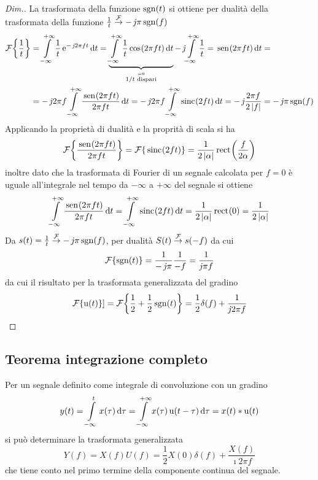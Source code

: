 \begin{proof}[Dim.]
La trasformata della funzione $\operatorname{sgn}(t)$ si ottiene per dualità della trasformata della funzione $\frac{1}{t}\overset{\operatorname{\mathcal{F}}}{\to}-\operatorname{\mathit{j}\!}\pi\operatorname{sgn}(f)$
\begin{align*}
	\fourier{\frac{1}{t}}&=\intinf{\frac{1}{t}\e{-\imath 2\pi f t}}{t}= \underbrace{\intinf{\frac{1}{t}\cos{2\pi f t}}{t}}_{\stackrel{=0}{1/t \text{ dispari}}}-\imath\intinf{\frac{1}{t}=\sen{2\pi f t}}{t}=\\
	&=-\imath 2\pi f\intinf{\frac{\sen{2\pi f t}}{2\pi f t}}{t}=-\imath 2\pi f\intinf{\sinc{2 f t}}{t}=-\imath\frac{2\pi f}{2\abs{f}}=-\imath\pi\sgn(f)
\end{align*}
Applicando la proprietà di dualità e la proprità di scala si ha
\begin{equation*}
\operatorname{\mathcal{F}}\!\left\lbrace{\frac{\,{\operatorname{sen}}^{}\!\left({2\pi f t}\right)}{2\pi f t}}\right\rbrace=\operatorname{\mathcal{F}}\!\left\lbrace{\,{\operatorname{sinc}}^{}\!\left({2 f t}\right)}\right\rbrace=\frac{1}{2\left|{\alpha}\right|}\,{\operatorname{rect}}^{}\!\left({\frac{f}{2\alpha}}\right)
\end{equation*}
inoltre dato che la trasformata di Fourier di un segnale calcolata per $f=0$ è uguale all'integrale nel tempo da $-\infty$ a $+\infty$ del segnale si ottiene
\begin{equation*}
\int\limits_{-\infty}^{+\infty}{\frac{\,{\operatorname{sen}}^{}\!\left({2\pi f t}\right)}{2\pi f t}}{\,\mathop{}\!\mathrm{d}{t}}=\int\limits_{-\infty}^{+\infty}{\,{\operatorname{sinc}}^{}\!\left({2 f t}\right)}{\,\mathop{}\!\mathrm{d}{t}}=\frac{1}{2\left|{\alpha}\right|}\,{\operatorname{rect}}^{}\!\left({0}\right)=\frac{1}{2\left|{\alpha}\right|}
\end{equation*}
Da $s(t)=\frac{1}{t}\overset{\operatorname{\mathcal{F}}}{\to}-\operatorname{\mathit{j}\!}\pi\operatorname{sgn}(f)$, per dualità $S(t)\overset{\operatorname{\mathcal{F}}}{\to} s(-f)$ da cui
\[
	\operatorname{\mathcal{F}}\!\left\lbrace{\operatorname{sgn}(t)}\right\rbrace=\frac{1}{-\operatorname{\mathit{j}\!}\pi}\frac{1}{-f}=\frac{1}{\operatorname{\mathit{j}\!}\pi f}
\]
da cui il risultato per la trasformata generalizzata del gradino
\[
	\operatorname{\mathcal{F}}\!\left\lbrace{\operatorname{u}(t)}\right\rbrace]=\operatorname{\mathcal{F}}\!\left\lbrace{\frac{1}{2}+\frac{1}{2}\operatorname{sgn}(t)}\right\rbrace=\frac{1}{2}\delta(f)+\frac{1}{\operatorname{\mathit{j}\!} 2\pi f}
\qedhere
\]
\end{proof}

\subsection{Teorema integrazione completo}
Per un segnale definito come integrale di convoluzione con un gradino
\[
	y(t)=\int\limits_{-\infty}^{t}{x(\tau)}{\,\mathop{}\!\mathrm{d}{\tau}}=\int\limits_{-\infty}^{+\infty}{x(\tau)\operatorname{u}(t-\tau)}{\,\mathop{}\!\mathrm{d}{\tau}}=x(t)\ast\operatorname{u}(t)
\]
si può determinare la trasformata generalizzata
\begin{equation}
	Y(f)=X(f) U(f)=\frac{1}{2} X(0) \delta(f) + \frac{X(f)}{\imath 2\pi f}
\end{equation}
che tiene conto nel primo termine della componente continua del segnale.

